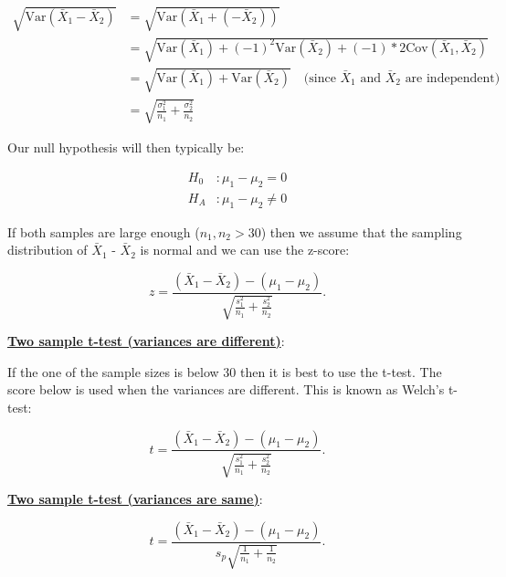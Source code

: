 \begin{equation}
\begin{split}
\sqrt{\text{Var}(\bar{X}_1 - \bar{X}_2)} & = \sqrt{\text{Var}(\bar{X}_1 + (- \bar{X}_2))} \\
&=\sqrt{\text{Var}(\bar{X}_1) + (-1)^2 \text{Var}(\bar{X}_2) + (-1)*2\text{Cov}(\bar{X}_1, \bar{X}_2)} \\
&=\sqrt{\text{Var}(\bar{X}_1) + \text{Var}(\bar{X}_2)}  \hspace{1em}   \text{(since $\bar{X}_1$ and $\bar{X}_2$ are independent)}\\
&=\sqrt{ \frac{\sigma_1^2}{n_1} + \frac{\sigma_2^2}{n_2}}
\end{split}
\end{equation}

Our null hypothesis will then typically be:

\begin{equation}
\begin{split}
H_0 &: \mu_1 - \mu_2 = 0 \\
H_A &:   \mu_1 - \mu_2 \neq 0
\end{split}
\end{equation}

\noindent If both samples are large enough ($n_1, n_2 > 30$) then we assume that the sampling distribution of $\bar{X}_1$ - $\bar{X}_2$ is normal and we can use the z-score:

\begin{equation}
z = \frac{(\bar{X}_1 -   \bar{X}_2) - (\mu_1 - \mu_2)}{\sqrt{\frac{s_1^2}{n_1} + \frac{s_2^2}{n_2}}}.
\end{equation}

\noindent \underline{\textbf{Two sample t-test (variances are different)}}:

If the one of the sample sizes is below 30 then it is best to use the t-test. The score below is used when the variances are different. This is known as Welch's t-test:

\begin{equation}
t = \frac{(\bar{X}_1 -   \bar{X}_2) - (\mu_1 - \mu_2)}{\sqrt{\frac{s_1^2}{n_1} + \frac{s_2^2}{n_2}}}.
\end{equation}

\noindent \underline{\textbf{Two sample t-test (variances are same)}}:

\begin{equation}
t = \frac{(\bar{X}_1 -   \bar{X}_2) - (\mu_1 - \mu_2)}{s_p\sqrt{\frac{1}{n_1} + \frac{1}{n_2}}}.
\end{equation}


